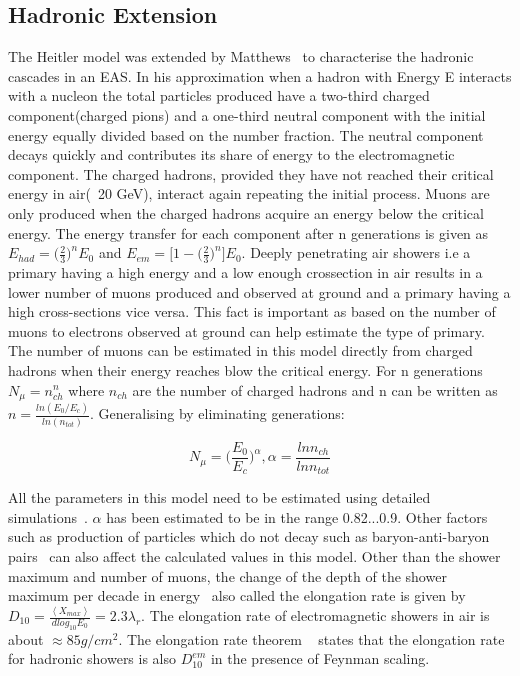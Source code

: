 \subsection*{Hadronic Extension}
\label{sec:Dev_Had}
The Heitler model was extended by Matthews~\cite{} to characterise the hadronic cascades in an EAS. In his approximation when a hadron with Energy E interacts with a nucleon the total particles produced have a two-third charged component(charged pions) and a one-third neutral component with the initial energy equally divided based on the number fraction. The neutral component decays quickly and contributes its share of energy to the electromagnetic component. The charged hadrons, provided they have not reached their critical energy in air(~20 GeV), interact again repeating the initial process. Muons are only produced when the charged hadrons acquire an energy below the critical energy. The energy transfer for each component after n generations is given as $E_{had} = \biggl(\frac{2}{3}\biggr)^n E_0$ and $E_{em} = \big[1- \biggl(  \frac{2}{3}\biggr)^n\big] E_0$. Deeply penetrating air showers i.e a primary having a high energy and a low enough crossection in air results in a lower number of muons produced and observed at ground and a primary having a high cross-sections vice versa. This fact is important as based on the number of muons to electrons observed at ground can help estimate the type of primary. The number of muons can be estimated in this model directly from charged hadrons when their energy reaches blow the critical energy. For n generations $N_{\mu} = n_{ch}^n$ where $n_{ch}$ are the number of charged hadrons and n can be written as $n = \frac{ln(E_0/E_c)}{ln(n_{tot})}$. Generalising by eliminating generations:

\begin{equation}
    N_{\mu} = \biggl(\frac{E_0}{E_c}\biggr)^{\alpha} , \alpha = \frac{ln n_{ch}}{ln n_{tot}}
\end{equation}

All the parameters in this model need to be estimated using detailed simulations~\cite{}. $\alpha$ has been estimated to be in the range 0.82...0.9. Other factors such as production of particles which do not decay such as baryon-anti-baryon pairs~\cite{} can also affect the calculated values in this model. Other than the shower maximum and number of muons, the change of the depth of the shower maximum per decade in energy~\cite{} also called the elongation rate is given by $D_{10} = \frac{\left\langle X_{max}\right\rangle }{dlog_{10}E_0} = 2.3\lambda_r$. The elongation rate of electromagnetic showers in air is about $\approx 85g/cm^2$. The elongation rate theorem ~\cite{} states that the elongation rate for hadronic showers is also $D_{10}^{em}$ in the presence of Feynman scaling.

